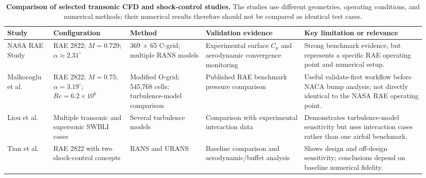 \documentclass[10pt]{article}
\begin{document}
\begin{table}[H]

\caption{\textbf{Comparison of selected transonic CFD and shock-control
studies.} The studies use different geometries, operating conditions,
and numerical methods; their numerical results therefore should not be
compared as identical test cases.}

\centering
\fontsize{9}{10}\selectfont

\begin{tabularx}{\textwidth}{
    L{2.0cm}
    L{2.15cm}
    L{2.15cm}
    L{2.4cm}
    Y
}

\toprule

\textbf{Study} &
\textbf{Configuration} &
\textbf{Method} &
\textbf{Validation evidence} &
\textbf{Key limitation or relevance} \\

\midrule

NASA RAE Study &
RAE 2822; $M=0.729$; $\alpha\approx2.31^\circ$ &
369 $\times$ 65 C-grid; multiple RANS models &
Experimental surface $C_p$ and aerodynamic convergence monitoring &
Strong benchmark evidence, but represents a specific RAE operating
point and numerical setup. \\

\addlinespace

Malkocoglu et al. &
RAE 2822; $M=0.75$; $\alpha=3.19^\circ$;
$Re=6.2\times10^6$ &
Modified O-grid; 545,768 cells; turbulence-model comparison &
Published RAE benchmark pressure comparison &
Useful validate-first workflow before NACA bump analysis; not directly
identical to the NASA RAE operating point. \\

\addlinespace

Liou et al. &
Multiple transonic and supersonic SWBLI cases &
Several turbulence models &
Comparison with experimental interaction data &
Demonstrates turbulence-model sensitivity but uses interaction cases
rather than one airfoil benchmark. \\

\addlinespace

Tian et al. &
RAE 2822 with two shock-control concepts &
RANS and URANS &
Baseline comparison and aerodynamic/buffet analysis &
Shows design and off-design sensitivity; conclusions depend on baseline
numerical fidelity. \\

\bottomrule

\end{tabularx}

\end{table}
\end{document}
